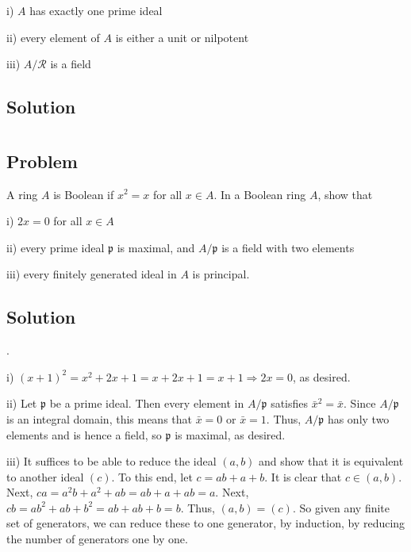 \documentclass[book,12pt,oneside,openany]{memoir}
\begin{document}
i) $A$ has exactly one prime ideal

ii) every element of $A$ is either a unit or nilpotent

iii) $A/\mathcal{R}$ is a field
\subsection{Solution}



\section{}
\subsection{Problem}
A ring $A$ is Boolean if $x^2 = x$ for all $x \in A$. In a Boolean ring $A$, show that 

i) $2x = 0$ for all $x \in A$

ii) every prime ideal $\mathfrak{p}$ is maximal, and $A/\mathfrak{p}$ is a field with two elements

iii) every finitely generated ideal in $A$ is principal.
\subsection{Solution}

.

i) $(x +1)^2 = x^2 + 2x + 1 = x + 2x + 1 = x + 1 \Rightarrow 2x = 0$, as desired.

ii) Let $\mathfrak{p}$ be a prime ideal. Then every element in $A/\mathfrak{p}$ satisfies $\bar{x}^2 = \bar{x}$. Since $A/\mathfrak{p}$ is an integral domain, this means that $\bar{x} = 0$ or $\bar{x} = 1$. Thus, $A/\mathfrak{p}$ has only two elements and is hence a field, so $\mathfrak{p}$ is maximal, as desired.

iii) It suffices to be able to reduce the ideal $(a, b)$ and show that it is equivalent to another ideal $(c)$. To this end, let $c = ab + a + b$. It is clear that $c \in (a,b)$. Next, $ca = a^2b + a^2 + ab = ab + a + ab = a$. Next, $cb = ab^2 + ab + b^2 = ab + ab + b = b$. Thus, $(a,b) = (c)$. So given any finite set of generators, we can reduce these to one generator, by induction, by reducing the number of generators one by one.


\section{}
\end{document}
